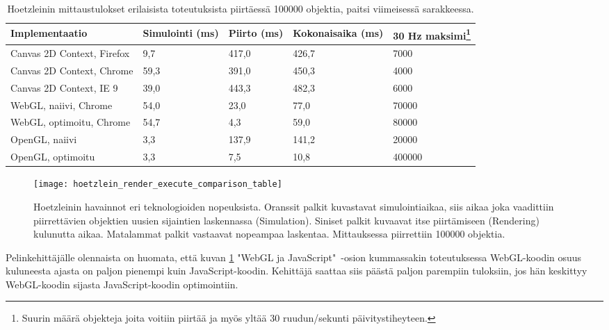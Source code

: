 \begin{table}[h]
    \begin{minipage}{\textwidth}
    \caption{\label{tab:hoetzlein_diff}Hoetzleinin\cite{hoetzlein}\cite{hoetzlein_data} mittaustulokset erilaisista toteutuksista piirtäessä 100000 objektia, paitsi viimeisessä sarakkeessa.}
    \begin{tabular}{ |l|p{2cm}|p{1.1cm}|p{2.5cm}|p{2cm}| }
        \hline
        \textbf{Implementaatio} & \textbf{Simulointi (ms)} & \textbf{Piirto (ms)} & \textbf{Kokonaisaika (ms)} & \textbf{30 Hz maksimi\footnote{Suurin määrä objekteja joita voitiin piirtää ja myös yltää 30 ruudun/sekunti päivitystiheyteen.}} \\ \hline
        Canvas 2D Context, Firefox  & 9,7   & 417,0 & 426,7 & 7000      \\ \hline
        Canvas 2D Context, Chrome   & 59,3  & 391,0 & 450,3 & 4000      \\ \hline
        Canvas 2D Context, IE 9     & 39,0  & 443,3 & 482,3 & 6000      \\ \hline
        WebGL, naiivi, Chrome       & 54,0  & 23,0  & 77,0  & 70000     \\ \hline
        WebGL, optimoitu, Chrome    & 54,7  & 4,3   & 59,0  & 80000     \\ \hline
        OpenGL, naiivi              & 3,3   & 137,9 & 141,2 & 20000     \\ \hline
        OpenGL, optimoitu           & 3,3   & 7,5   & 10,8  & 400000    \\ \hline
    \end{tabular}
    \end{minipage}
\end{table}

\begin{figure}[h]
    \texttt{[image: hoetzlein\_render\_execute\_comparison\_table]}
    \caption{\label{fig:hoetzlein_comparison}Hoetzleinin\cite{hoetzlein} havainnot eri teknologioiden nopeuksista. Oranssit palkit kuvastavat simulointiaikaa, siis aikaa joka vaadittiin piirrettävien objektien uusien sijaintien laskennassa (Simulation). Siniset palkit kuvaavat itse piirtämiseen (Rendering) kulunutta aikaa. Matalammat palkit vastaavat nopeampaa laskentaa. Mittauksessa piirrettiin 100000 objektia.}
\end{figure}

Pelinkehittäjälle olennaista on huomata, että kuvan \ref{fig:hoetzlein_comparison} "WebGL ja JavaScript"~-osion kummassakin toteutuksessa WebGL-koodin osuus kuluneesta ajasta on paljon pienempi kuin JavaScript-koodin. Kehittäjä saattaa siis päästä paljon parempiin tuloksiin, jos hän keskittyy WebGL-koodin sijasta JavaScript-koodin optimointiin. 

